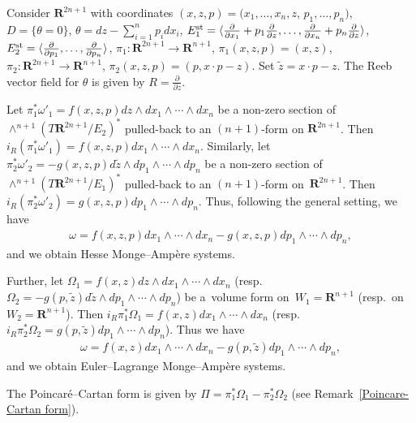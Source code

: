 \documentclass[pdftex]{sigma}
\begin{document}
\begin{Ex}
\label{standard model calcu}
Consider ${\mathbf{R}}^{2n+1}$ with coordinates $(x, z, p) =
(x_1, \dots, x_n, z$, $p_1, \dots, p_n)$, $D = \{ \theta = 0\}$,
$\theta = dz - \sum\limits_{i=1}^n p_i dx_i$,
$E^{\rm{st}}_1 =
\langle \frac{\partial}{\partial x_1} + p_1\frac{\partial}{\partial z},
\dots, \frac{\partial}{\partial x_n} + p_n\frac{\partial}{\partial z}\rangle$,
$E^{\rm{st}}_2 =
\langle \frac{\partial}{\partial p_1},
\dots, \frac{\partial}{\partial p_n}\rangle$, $\pi_1 \colon  {\mathbf{R}}^{2n+1} \to
{\mathbf{R}}^{n+1}$, $\pi_1(x, z, p) = (x, z)$, $\pi_2 \colon  {\mathbf{R}}^{2n+1} \to
{\mathbf{R}}^{n+1}$, $\pi_2(x, z, p) = (p, x\cdot p - z)$. Set $\tilde{z} = x\cdot p - z$.
The Reeb vector f\/ield for $\theta$ is given by
$R = \frac{\partial}{\partial z}$.

Let $\pi_1^*\omega'_1 = f(x, z, p) dz \wedge dx_1\wedge \cdots \wedge dx_n$
be a non-zero section of $\wedge^{n+1}(T{\mathbf{R}}^{2n+1}/E_2)^*$
pulled-back to an $(n+1)$-form on ${\mathbf{R}}^{2n+1}$.
Then $i_R (\pi_1^*\omega'_1) = f(x, z, p) dx_1\wedge \cdots \wedge dx_n$.
Similarly, let
$\pi_2^*\omega'_2 = -g(x, z, p) d\tilde{z} \wedge dp_1\wedge \cdots \wedge
dp_n$ be a non-zero section of $\wedge^{n+1}(T{\mathbf{R}}^{2n+1}/E_1)^*$
pulled-back to an $(n+1)$-form on~${\mathbf{R}}^{2n+1}$.
Then $i_R (\pi_2^*\omega'_2) = g(x, z, p) dp_1\wedge \cdots \wedge dp_n$.
Thus, following the general setting, we have
\begin{gather*}
\omega = f(x, z, p)dx_1\wedge \cdots \wedge dx_n -
g(x, z, p) dp_1\wedge \cdots \wedge dp_n,
\end{gather*}
and we obtain Hesse Monge--Amp{\`e}re systems.

Further, let $\Omega_1 =
f(x, z) dz \wedge dx_1\wedge \cdots \wedge dx_n$
(resp.\ $\Omega_2 = - g(p, \tilde{z}) d\tilde{z} \wedge dp_1\wedge \cdots
\wedge dp_n$) be
a~volume form on~$W_1 = {\mathbf{R}}^{n+1}$ (resp.\ on~$W_2 = {\mathbf{R}}^{n+1}$).
Then $i_R \pi_1^*\Omega_1 =
f(x, z) dx_1\wedge \cdots \wedge dx_n$
(resp.\ $i_R \pi_2^*\Omega_2 =
g(p, \tilde{z}) dp_1\wedge \cdots \wedge dp_n$).
Thus we have
\begin{gather*}
\omega = f(x, z) dx_1\wedge \cdots \wedge dx_n
- g(p, \tilde{z}) dp_1\wedge \cdots \wedge dp_n,
\end{gather*}
and we obtain Euler--Lagrange Monge--Amp\`ere systems.
\end{Ex}

\begin{Rem}
The Poincar\'{e}--Cartan form is given by $\Pi = \pi_1^*\Omega_1 - \pi_2^*\Omega_2$ (see Remark~\ref{Poincare-Cartan form}).
\end{Rem}
\end{document}

